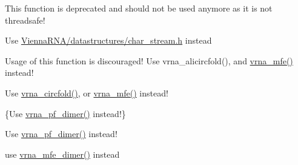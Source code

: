 \begin{DoxyRefList}
\item[\label{deprecated__deprecated000105}%
\Hypertarget{deprecated__deprecated000105}%
Global \hyperlink{part__func_8h_ae89a63bd83e75a80b2ba36d20b31ce81}{centroid} (int length, double $\ast$dist)]This function is deprecated and should not be used anymore as it is not threadsafe!  
\item[\label{deprecated__deprecated000029}%
\Hypertarget{deprecated__deprecated000029}%
File \hyperlink{char__stream_8h}{char\+\_\+stream.h} ]Use \hyperlink{datastructures_2char__stream_8h}{Vienna\+R\+N\+A/datastructures/char\+\_\+stream.\+h} instead  
\item[\label{deprecated__deprecated000013}%
\Hypertarget{deprecated__deprecated000013}%
Global \hyperlink{group__mfe__global__deprecated_gadbd3b0b1c144cbfb4efe704b2b260f96}{circalifold} (const char $\ast$$\ast$strings, char $\ast$structure)]Usage of this function is discouraged! Use vrna\+\_\+alicircfold(), and \hyperlink{group__mfe__global_gabd3b147371ccf25c577f88bbbaf159fd}{vrna\+\_\+mfe()} instead!  
\item[\label{deprecated__deprecated000068}%
\Hypertarget{deprecated__deprecated000068}%
Global \hyperlink{group__mfe__global__deprecated_ga4ac63ab3e8d9a80ced28b8052d94e423}{circfold} (const char $\ast$sequence, char $\ast$structure)]Use \hyperlink{group__mfe__global_gaf973483d8acbc8cc9aacfc8a9b7f0074}{vrna\+\_\+circfold()}, or \hyperlink{group__mfe__global_gabd3b147371ccf25c577f88bbbaf159fd}{vrna\+\_\+mfe()} instead! 
\item[\label{deprecated__deprecated000110}%
\Hypertarget{deprecated__deprecated000110}%
Global \hyperlink{group__part__func__global__deprecated_gae5c1e7331718669bdae7a86de2be6184}{co\+\_\+pf\+\_\+fold} (char $\ast$sequence, char $\ast$structure)]\{Use \hyperlink{group__part__func__global_ga4e5c7d06c302a7c59fc0d64dc142ca63}{vrna\+\_\+pf\+\_\+dimer()} instead!\} 
\item[\label{deprecated__deprecated000111}%
\Hypertarget{deprecated__deprecated000111}%
Global \hyperlink{group__part__func__global__deprecated_gaabfc6cb6d02b8f08ac4c92f4f5b125d9}{co\+\_\+pf\+\_\+fold\+\_\+par} (char $\ast$sequence, char $\ast$structure, vrna\+\_\+exp\+\_\+param\+\_\+t $\ast$parameters, int calculate\+\_\+bppm, int is\+\_\+constrained)]Use \hyperlink{group__part__func__global_ga4e5c7d06c302a7c59fc0d64dc142ca63}{vrna\+\_\+pf\+\_\+dimer()} instead! 
\item[\label{deprecated__deprecated000030}%
\Hypertarget{deprecated__deprecated000030}%
Global \hyperlink{group__mfe__global__deprecated_gabc8517f22cfe70595ee81fc837910d52}{cofold} (const char $\ast$sequence, char $\ast$structure)]use \hyperlink{group__mfe__global_gaab22d10c1190f205f16a77cab9d5d3ee}{vrna\+\_\+mfe\+\_\+dimer()} instead 
$$
\end{DoxyRefList}
